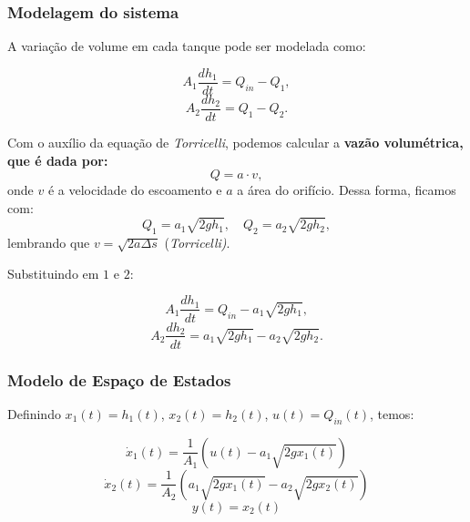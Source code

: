 \documentclass[12pt,a4]{article}
\begin{document}
\subsubsection{Modelagem do sistema}

A variação de volume em cada tanque pode ser modelada como:

\begin{equation}
A_1 \dfrac{dh_1}{dt} = Q_{in} - Q_1,
\end{equation}
\begin{equation}
A_2 \dfrac{dh_2}{dt} = Q_1 - Q_2.
\end{equation}

Com o auxílio  da equação de \textit{Torricelli}, podemos calcular a 
\textbf{vazão volumétrica, que é dada por:}
\begin{equation}
    Q=a\cdot v,
\end{equation}
onde $v$ é a velocidade do escoamento e $a$ a área do orifício. Dessa forma, ficamos com:
\begin{equation}
Q_1 = a_1 \sqrt{2g h_1}, \quad Q_2 = a_2 \sqrt{2g h_2},
\end{equation}
lembrando que $v=\sqrt{2a\Delta s}$ (\textit{Torricelli)}.

Substituindo em $1$ e $2$:

\begin{equation}
A_1 \frac{dh_1}{dt} = Q_{in} - a_1 \sqrt{2g h_1},
\end{equation}
\begin{equation}
A_2 \frac{dh_2}{dt} = a_1 \sqrt{2g h_1} - a_2 \sqrt{2g h_2}.
\end{equation}

\subsubsection{Modelo de Espaço de Estados}

Definindo $ x_1(t) = h_1(t) $, $ x_2(t) = h_2(t) $, $ u(t) = Q_{in}(t) $, temos:

\begin{equation}
\dot{x}_1(t) = \frac{1}{A_1} \left( u(t) - a_1 \sqrt{2g x_1(t)} \right)
\end{equation}
\begin{equation}
\dot{x}_2(t) = \frac{1}{A_2} \left( a_1 \sqrt{2g x_1(t)} - a_2 \sqrt{2g x_2(t)} \right)
\end{equation}
\begin{equation}
y(t) = x_2(t)
\end{equation}
\end{document}
